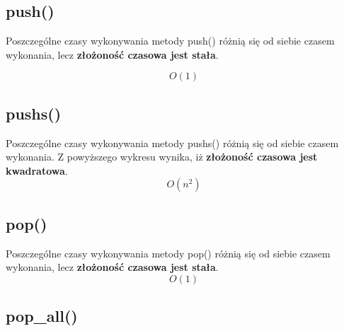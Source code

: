 \documentclass[12pt]{article}
\begin{document}
\begin{multicols}{2}
    \subsection{push()}


\begin{figure}[H]
    \centering
    
    \label{graph: push}
\end{figure}
{\small
Poszczególne czasy wykonywania metody push() różnią się od siebie czasem wykonania, lecz \textbf{złożoność czasowa jest stała}.

}
\Large{
\begin{equation*}
    O(1)
\end{equation*}}

\subsection{pushs()}

\begin{figure}[H]
    \centering
    
    \label{graph: pushs}    
\end{figure}
{\small Poszczególne czasy wykonywania metody pushs() różnią się od siebie czasem wykonania. Z powyższego wykresu wynika, iż \textbf{złożoność czasowa jest kwadratowa}.}
{\Large
\begin{equation*}
    O(n^2)
\end{equation*}}

\subsection{pop()}
\begin{figure}[H]
    \centering
   
    \label{graph: pop}
    
\end{figure}
Poszczególne czasy wykonywania metody pop() różnią się od siebie czasem wykonania, lecz \textbf{złożoność czasowa jest stała}.
\Large{
\begin{equation*}
    O(1)
\end{equation*}}


\subsection{pop\_all()}
\begin{figure}[H]
    \centering
    
    \label{graph: pop_all}
    

\end{figure}
\end{multicols}
\end{document}
